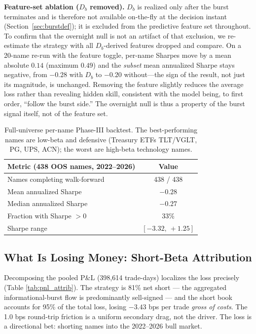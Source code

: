 \documentclass[11pt]{article}
\begin{document}
\textbf{Feature-set ablation ($D_b$ removed).} $D_b$ is realized only after the burst terminates and is therefore not available on-the-fly at the decision instant (Section~\ref{sec:burstdef}); it is excluded from the predictive feature set throughout. To confirm that the overnight null is not an artifact of that exclusion, we re-estimate the strategy with all $D_b$-derived features dropped and compare. On a 20-name re-run with the feature toggle, per-name Sharpes move by a mean absolute $0.14$ (maximum $0.49$) and the \emph{subset} mean annualized Sharpe stays negative, from $-0.28$ with $D_b$ to $-0.20$ without---the sign of the result, not just its magnitude, is unchanged. Removing the feature slightly reduces the average loss rather than revealing hidden skill, consistent with the model being, to first order, ``follow the burst side.'' The overnight null is thus a property of the burst signal itself, not of the feature set.

\begin{table}[htbp]
\centering
\begin{tabular}{lc}
\toprule
\textbf{Metric (438 OOS names, 2022--2026)} & \textbf{Value} \\
\midrule
Names completing walk-forward & 438 / 438 \\
Mean annualized Sharpe & $-0.28$ \\
Median annualized Sharpe & $-0.27$ \\
Fraction with Sharpe $>0$ & 33\% \\
Sharpe range & $[-3.32,\ +1.25]$ \\
\bottomrule
\end{tabular}
\caption{Full-universe per-name Phase-III backtest. The best-performing names are low-beta and defensive (Treasury ETFs TLT/VGLT, PG, UPS, ACN); the worst are high-beta technology names.}
\label{tab:breadth_sweep}
\end{table}

\subsection{What Is Losing Money: Short-Beta Attribution}
Decomposing the pooled P\&L (398{,}614 trade-days) localizes the loss precisely (Table \ref{tab:pnl_attrib}). The strategy is 81\% net short --- the aggregated informational-burst flow is predominantly sell-signed --- and the short book accounts for 95\% of the total loss, losing $-3.43$ bps per trade \emph{gross of costs}. The 1.0 bps round-trip friction is a uniform secondary drag, not the driver. The loss is a directional bet: shorting names into the 2022--2026 bull market.
\end{document}
